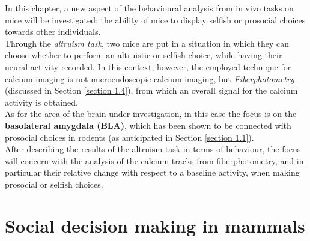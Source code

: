 \documentclass[12pt, a4paper]{report}
\begin{document}
In this chapter, a new aspect of the behavioural analysis from in vivo tasks on mice will be investigated: the ability of mice to display selfish or prosocial choices towards other individuals.\\
Through the \textit{altruism task}, two mice are put in a situation in which they can choose whether to perform an altruistic or selfish choice, while having their neural activity recorded. In this context, however, the employed technique for calcium imaging is not microendoscopic calcium imaging, but \textit{Fiberphotometry} (discussed in Section \ref{section 1.4}), from which an overall signal for the calcium activity is obtained.\\
As for the area of the brain under investigation, in this case the focus is on the \textbf{basolateral amygdala (BLA)}, which has been shown to be connected with prosocial choices in rodents (as anticipated in Section \ref{section 1.1}).\\
After describing the results of the altruism task in terms of behaviour, the focus will concern with the analysis of the calcium tracks from fiberphotometry, and in particular their relative change with respect to a baseline activity, when making prosocial or selfish choices.


\section{Social decision making in mammals}
\end{document}
